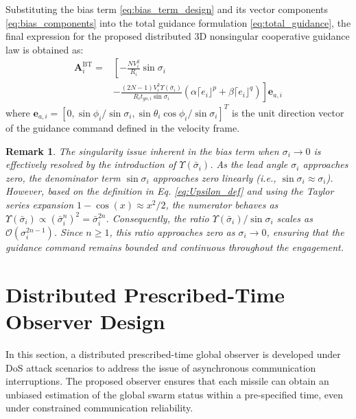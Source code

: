 \documentclass[lettersize,journal]{IEEEtran}
\newtheorem{remark}{Remark}
\begin{document}
Substituting the bias term \eqref{eq:bias_term_design} and its vector components \eqref{eq:bias_components} into the total guidance formulation \eqref{eq:total_guidance}, the final expression for the proposed distributed 3D nonsingular cooperative guidance law is obtained as:
\begin{equation}
	\label{eq:final_guidance_law}
	\begin{aligned}
		\boldsymbol{A}^{\mathrm{BT}}_i
		= & \left[ - \frac{N V_i^2}{R_i} \sin \sigma_i \right. \\
		& \left. - \frac{(2N-1)V_i^2 \Upsilon(\bar{\sigma}_i)}
		{R_i t_{go,i} \sin \sigma_i}
		\left( \alpha \lceil e_i \rfloor^p
		+ \beta \lceil e_i \rfloor^q \right)
		\right] \mathbf{e}_{a,i}
	\end{aligned}
\end{equation}
where $\mathbf{e}_{a,i} = [0, \sin\phi_i/\sin\sigma_i, \sin\theta_i\cos\phi_i/\sin\sigma_i]^T$ is the unit direction vector of the guidance command defined in the velocity frame.
\vspace{1mm}
\begin{remark}
	The singularity issue inherent in the bias term when $\sigma_i \to 0$ is effectively resolved by the introduction of $\Upsilon(\bar{\sigma}_i)$. As the lead angle $\sigma_i$ approaches zero, the denominator term $\sin \sigma_i$ approaches zero linearly (i.e., $\sin \sigma_i \approx \sigma_i$). However, based on the definition in Eq. \eqref{eq:Upsilon_def} and using the Taylor series expansion $1-\cos(x) \approx x^2/2$, the numerator behaves as $\Upsilon(\bar{\sigma}_i) \propto (\bar{\sigma}_i^n)^2 = \bar{\sigma}_i^{2n}$. Consequently, the ratio $\Upsilon(\bar{\sigma}_i)/\sin \sigma_i$ scales as $\mathcal{O}(\sigma_i^{2n-1})$. Since $n \ge 1$, this ratio approaches zero as $\sigma_i \to 0$, ensuring that the guidance command remains bounded and continuous throughout the engagement.
\end{remark}
\vspace{1mm}
\section{Distributed Prescribed-Time Observer Design}
In this section, a distributed prescribed-time global observer is developed under DoS attack scenarios to address the issue of asynchronous communication interruptions. The proposed observer ensures that each missile can obtain an unbiased estimation of the global swarm status within a pre-specified time, even under constrained communication reliability.
\end{document}
